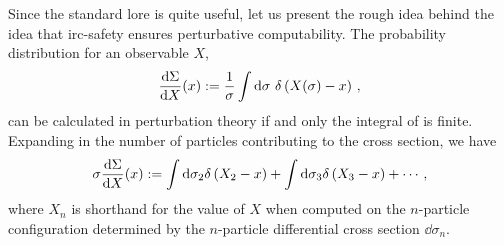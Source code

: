 


Since the standard lore is quite useful, let us present the rough idea behind the idea that \gls{irc-safety} ensures perturbative computability.
%
The probability distribution for an observable \(X\),
\begin{align}
    \label{eq:prob_distribution}
    \frac{\dd\Sigma}{\dd X}(x)
    :=
    \frac{1}{\sigma}
    \int \dd \sigma
    \,\,
    \delta\le(X(\sigma) - x\ri)
    \,,
\end{align}
can be calculated in perturbation theory if and only the integral of  is finite.
%
Expanding in the number of particles contributing to the cross section, we have
\begin{align}
    \label{eq:prob_distribution}
    \sigma \frac{\dd\Sigma}{\dd X}(x)
    :=
    \int \dd\sigma_2 \delta\le(X_2 - x\ri)
    +
    \int \dd\sigma_3 \delta\le(X_3 - x\ri)
    +
    \cdots
    \,,
\end{align}
where \(X_n\) is shorthand for the value of \(X\) when computed on the \(n\)-particle configuration determined by the \(n\)-particle differential cross section \(\dd \sigma_n\).

